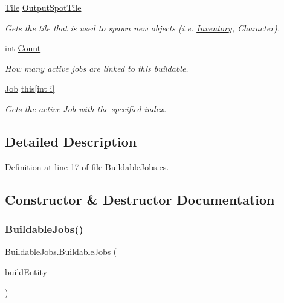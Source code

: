 \begin{DoxyCompactItemize}
\hyperlink{class_tile}{Tile} \hyperlink{class_buildable_jobs_aa8bda994afc1614cb14f9021f3c6e3ac}{Output\+Spot\+Tile}
\begin{DoxyCompactList}\small\item\em Gets the tile that is used to spawn new objects (i.\+e. \hyperlink{class_inventory}{Inventory}, Character). \end{DoxyCompactList}\item 
int \hyperlink{class_buildable_jobs_a19d62a0f9f218a281481bae5b3d6863b}{Count}
\begin{DoxyCompactList}\small\item\em How many active jobs are linked to this buildable. \end{DoxyCompactList}\item 
\hyperlink{class_job}{Job} \hyperlink{class_buildable_jobs_ae00535b7e3944cb463dfa2df8d76c3c1}{this\mbox{[}int i\mbox{]}}
\begin{DoxyCompactList}\small\item\em Gets the active \hyperlink{class_job}{Job} with the specified index. \end{DoxyCompactList}\end{DoxyCompactItemize}


\subsection{Detailed Description}


Definition at line 17 of file Buildable\+Jobs.\+cs.



\subsection{Constructor \& Destructor Documentation}
\mbox{\label{class_buildable_jobs_adae8130157e0004cd6cf62275698c81f}} 
\subsubsection{\texorpdfstring{Buildable\+Jobs()}{BuildableJobs()}\hspace{0.1cm}{\footnotesize\ttfamily [1/2]}}
{\footnotesize\ttfamily Buildable\+Jobs.\+Buildable\+Jobs (\begin{DoxyParamCaption}\item[{\hyperlink{interface_i_buildable}{I\+Buildable}}]{build\+Entity }\end{DoxyParamCaption})}



